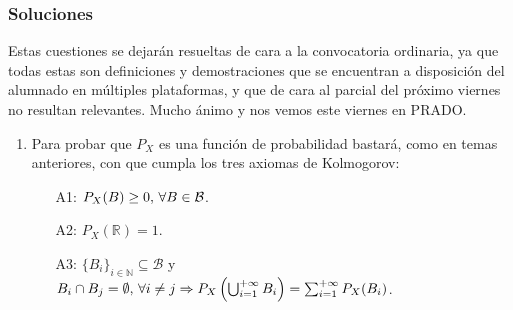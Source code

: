 \documentclass[fleqn]{article}
\def\R{\mathds{R}}
\def\N{\mathds{N}}
\begin{document}
\begin{enumerate}
                \subsubsection{Soluciones}
                                Estas cuestiones se dejarán resueltas de cara a la convocatoria ordinaria, ya que todas estas son definiciones y demostraciones
                        que se encuentran a disposición del alumnado en múltiples plataformas, y que de cara al parcial del próximo viernes no resultan 
                        relevantes. Mucho ánimo y nos vemos este viernes en PRADO.

                        \begin{enumerate}
                                \item Para probar que $P_X$ es una función de probabilidad bastará, como en temas anteriores, con que cumpla los tres axiomas
                                        de Kolmogorov:
                                        \begin{enumerate}
                                                \item[A1:]  $P_X(B) \geq 0, \thinspace \forall B \in \mathcal{B}$. 
                                                \item[A2:]  $ P_X(\R) = 1$.
                                                \item[A3:]  $ \{B_i\}_{i \in \N} \subseteq \mathcal{B}$ y $B_i \cap B_j = \emptyset, \thinspace \forall i \neq j 
                                                                \Rightarrow P_X \left( \bigcup_{i=1}^{+\infty} B_i\right) = \sum_{i=1}^{+\infty} P_X(B_i)$.
                                        \end{enumerate}
                        \end{enumerate}

        \end{enumerate}
\end{document}
